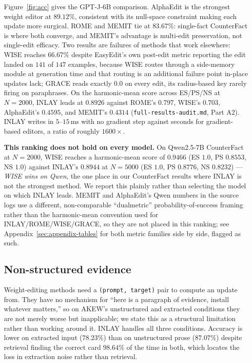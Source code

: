 \documentclass[11pt]{article}
\begin{document}
Figure~\ref{fig:acc} gives the GPT-J-6B comparison. AlphaEdit is the
strongest weight editor at $89.12\%$, consistent with its null-space
constraint making each update more surgical. ROME and MEMIT tie at
$83.67\%$: single-fact CounterFact is where both converge, and MEMIT's
advantage is multi-edit preservation, not single-edit efficacy. Two results
are failures of methods that work elsewhere: WISE reaches $66.67\%$ despite
EasyEdit's own post-edit metric reporting the edit landed on $141$ of $147$
examples, because WISE routes through a side-memory module at generation
time and that routing is an additional failure point in-place updates lack;
GRACE reads exactly $0.0$ on every edit, its radius-based key rarely firing
on paraphrases. On the harmonic-mean score across ES/PS/NS at $N{=}2000$,
INLAY leads at $0.8926$ against ROME's $0.797$, WISE's $0.703$, AlphaEdit's
$0.4595$, and MEMIT's $0.4314$ (\texttt{full-results-audit.md}, Part A2).
INLAY writes in
$5$--$15$\,ms with no gradient step against seconds for gradient-based
editors, a ratio of roughly $1600\times$.

\textbf{This ranking does not hold on every model.} On Qwen2.5-7B
CounterFact at $N{=}2000$, WISE reaches a harmonic-mean score of
$\mathbf{0.9466}$ (ES $1.0$, PS $0.8553$, NS $1.0$) against INLAY's
$\mathbf{0.8944}$ at $N{=}5000$ (ES $1.0$, PS $0.8776$, NS $0.8232$) ---
\emph{WISE wins on Qwen}, the one place in our CounterFact results where
INLAY is not the strongest method. We report this plainly rather than
selecting the model on which INLAY leads. MEMIT and AlphaEdit's Qwen numbers
in the source logs use a different, non-comparable ``dualmetric''
probability-of-success framing rather than the harmonic-mean convention used
for INLAY/ROME/WISE/GRACE, so they are not placed in this ranking; see
Appendix~\ref{sec:appendix-tables} for both metric families side by side,
flagged as such.

\subsection{Non-structured evidence}
Weight-editing methods need a \texttt{(prompt, target)} pair to compute an
update from. They have no mechanism for ``here is a paragraph of evidence,
install whatever matters,'' so on AKEW's unstructured and extracted
conditions they are not merely worse but inapplicable; we state this as a
structural limitation rather than working around it. INLAY handles all three
conditions. Accuracy is lower on extracted input ($78.23\%$) than on
unstructured prose ($87.07\%$) despite retrieval finding the correct card
$98.64\%$ of the time in both, which locates the loss in extraction noise
rather than retrieval.
\end{document}
